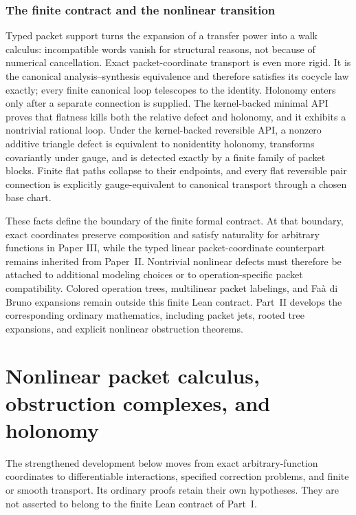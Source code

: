 \documentclass[11pt,a4paper]{article}
\theoremstyle{plain}
\theoremstyle{definition}
\theoremstyle{remark}
\begin{document}
\section{The finite contract and the nonlinear transition}

Typed packet support turns the expansion of a transfer power into a walk
calculus: incompatible words vanish for structural reasons, not because of
numerical cancellation.  Exact packet-coordinate transport is even more
rigid.  It is the canonical analysis--synthesis equivalence and therefore
satisfies its cocycle law exactly; every finite canonical loop telescopes to
the identity.  Holonomy enters only after a separate connection is supplied.
The kernel-backed minimal API proves that flatness kills both the relative
defect and holonomy, and it exhibits a nontrivial rational loop.  Under the
kernel-backed reversible API, a nonzero additive triangle defect is equivalent to nonidentity
holonomy, transforms covariantly under gauge, and is detected exactly by a
finite family of packet blocks.  Finite flat paths collapse to their endpoints,
and every flat reversible pair connection is explicitly gauge-equivalent to
canonical transport through a chosen base chart.

These facts define the boundary of the finite formal contract.  At that
boundary, exact coordinates preserve composition and satisfy naturality for
arbitrary functions in Paper III, while the typed linear packet-coordinate
counterpart remains inherited from Paper~II.  Nontrivial nonlinear defects
must therefore be attached to additional modeling choices or to
operation-specific packet compatibility.  Colored operation trees,
multilinear packet labelings, and Fa\`a di Bruno expansions remain
outside this finite Lean contract. Part~II develops the corresponding ordinary mathematics, including packet jets, rooted tree expansions, and explicit nonlinear obstruction theorems.


\clearpage
\part{Nonlinear packet calculus, obstruction complexes, and holonomy}\label{part:nonlinear}
\noindent The strengthened development below moves from exact arbitrary-function coordinates to differentiable interactions, specified correction problems, and finite or smooth transport. Its ordinary proofs retain their own hypotheses. They are not asserted to belong to the finite Lean contract of Part~I.
\end{document}
